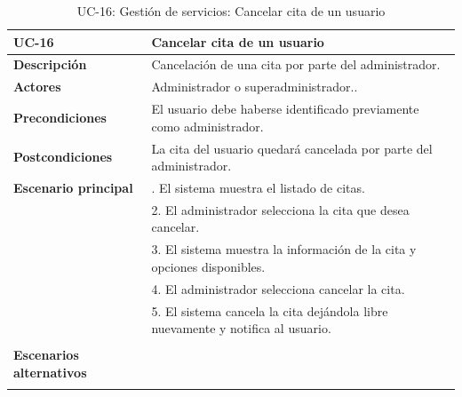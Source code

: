 \begin{table}[H]
  \begin{center}
    \begin{tabularx}{16.4cm}{|l|X|}
      \hline
      \textbf{UC-16} & \textbf{Cancelar cita de un usuario}\\
      \hline
      \textbf{Descripción} & Cancelación de una cita por parte del administrador. \\
      \hline
      \textbf{Actores} & Administrador o superadministrador..\\
      \hline
      \textbf{Precondiciones} & El usuario debe haberse identificado previamente como administrador.\\
      \hline
      \textbf{Postcondiciones} & La cita del usuario quedará cancelada por parte del administrador.\\
      \hline
      \textbf{Escenario principal} & \smallskip 1. El sistema muestra el listado de citas.\\
      & 2. El administrador selecciona la cita que desea cancelar.\\
      & 3. El sistema muestra la información de la cita y opciones disponibles.\\
      & 4. El administrador selecciona cancelar la cita.\\
      & 5. El sistema cancela la cita dejándola libre nuevamente y notifica al usuario.\\
      & \\
      \hline
      \textbf{Escenarios alternativos} & \\
      & \\
      \hline
    \end{tabularx}
    \caption{UC-16: Gestión de servicios: Cancelar cita de un usuario}
    \label{tab:CU-cancelar-cita-admin}
  \end{center}
\end{table}


